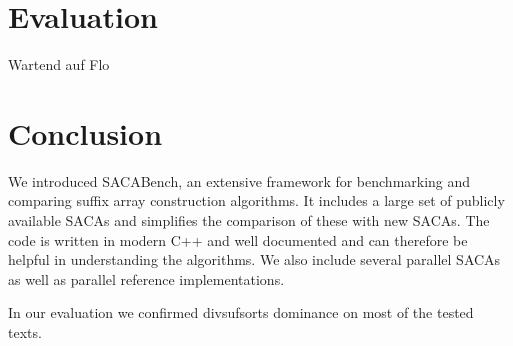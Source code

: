 \section{Evaluation}

Wartend auf Flo

\section{Conclusion}

We introduced SACABench, an extensive framework for benchmarking and comparing suffix array construction algorithms.
It includes a large set of publicly available SACAs and simplifies the comparison of these with new SACAs.
The code is written in modern C++ and well documented and can therefore be helpful in understanding the algorithms.
We also include several parallel SACAs as well as parallel reference implementations.

In our evaluation we confirmed divsufsorts dominance on most of the tested texts.

